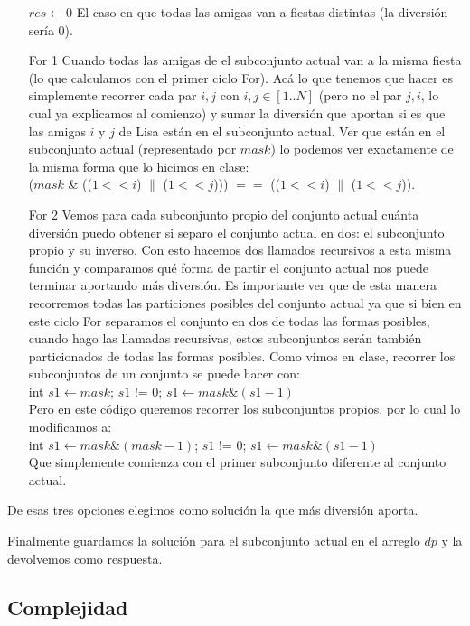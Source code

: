 \begin{itemize}
    \item [$res \gets 0$] El caso en que todas las amigas van a fiestas distintas (la diversión sería 0).
    \item [For 1] Cuando todas las amigas de el subconjunto actual van a la misma fiesta (lo que calculamos con el primer ciclo For). Acá lo que tenemos que hacer es simplemente recorrer cada par $i,j$ con $i,j \in [1..N]$ (pero no el par $j,i$, lo cual ya explicamos al comienzo) y sumar la diversión que aportan si es que las amigas $i$ y $j$ de Lisa están en el subconjunto actual. Ver que están en el subconjunto actual (representado por $mask$) lo podemos ver exactamente de la misma forma que lo hicimos en clase: \\
    ($mask$ \& (($1 << i$) $\|$ ($1 << j$))) $==$ (($1 << i$) $\|$ ($1 << j$)).
    \item [For 2] Vemos para cada subconjunto propio del conjunto actual cuánta diversión puedo obtener si separo el conjunto actual en dos: el subconjunto propio y su inverso. Con esto hacemos dos llamados recursivos a esta misma función y comparamos qué forma de partir el conjunto actual nos puede terminar aportando más diversión. Es importante ver que de esta manera recorremos todas las particiones posibles del conjunto actual ya que si bien en este ciclo For separamos el conjunto en dos de todas las formas posibles, cuando hago las llamadas recursivas, estos subconjuntos serán también particionados de todas las formas posibles. Como vimos en clase, recorrer los subconjuntos de un conjunto se puede hacer con: \\
    int $s1 \gets mask$; $s1$ != $0$; $s1 \gets mask \& (s1-1)$ \\
    Pero en este código queremos recorrer los subconjuntos propios, por lo cual lo modificamos a: \\
    int $s1 \gets mask \& (mask-1)$; $s1$ != $0$; $s1 \gets mask \& (s1-1)$ \\
    Que simplemente comienza con el primer subconjunto diferente al conjunto actual.
\end{itemize}

De esas tres opciones elegimos como solución la que más diversión aporta.

Finalmente guardamos la solución para el subconjunto actual en el arreglo $dp$ y la devolvemos como respuesta.

\subsection{Complejidad}

